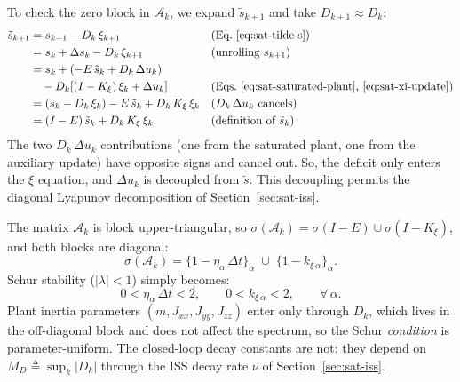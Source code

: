 \documentclass[conf]{new-aiaa}
\begin{document}
To check the zero block in $\mathcal{A}_k$, we expand $\tilde s_{k+1}$ and take $D_{k+1} \approx D_k$:
\small
\begingroup
\setlength{\jot}{1pt}
\begin{align}
\tilde s_{k+1}
&= s_{k+1} - D_k\, \xi_{k+1}
& &\text{(Eq.~\ref{eq:sat-tilde-s})} \notag \\
&= s_k + \Delta s_k - D_k\, \xi_{k+1}
& &\text{(unrolling $s_{k+1}$)} \notag \\
&= s_k + (-E\, \tilde s_k + D_k\, \Delta u_k) \notag \\
&\quad - D_k\!\left[ (I - K_\xi)\, \xi_k + \Delta u_k \right]
& &\text{(Eqs.~\ref{eq:sat-saturated-plant}, \ref{eq:sat-xi-update})} \notag \\
&= (s_k - D_k\, \xi_k) - E\, \tilde s_k + D_k\, K_\xi\, \xi_k
& &\text{($D_k\, \Delta u_k$ cancels)} \notag \\
\label{eq:sat-cancellation}
&= (I - E)\, \tilde s_k + D_k\, K_\xi\, \xi_k.
& &\text{(definition of $\tilde s_k$)}
\end{align}
\endgroup
\normalsize
The two $D_k\, \Delta u_k$ contributions (one from the saturated plant, one from the auxiliary update) have opposite signs and cancel out. So, the deficit only enters the $\xi$ equation, and $\Delta u_k$ is decoupled from $\tilde s$. This decoupling permits the diagonal Lyapunov decomposition of Section~\ref{sec:sat-iss}.

The matrix $\mathcal{A}_k$ is block upper-triangular, so $\sigma(\mathcal{A}_k) = \sigma(I - E) \cup \sigma(I - K_\xi)$, and both blocks are diagonal:
\small
\begin{equation}
\label{eq:sat-spectrum}
\sigma(\mathcal{A}_k) = \{1 - \eta_\alpha\,\Delta t\}_\alpha \;\cup\; \{1 - k_{\xi\, \alpha}\}_\alpha.
\end{equation}
\normalsize
Schur stability ($|\lambda| < 1$) simply becomes:
\begin{equation}
\label{eq:sat-schur}
0 < \eta_\alpha\, \Delta t < 2,
\qquad
0 < k_{\xi\, \alpha} < 2,
\qquad \forall\, \alpha.
\end{equation}
Plant inertia parameters $(m, J_{xx}, J_{yy}, J_{zz})$ enter only through $D_k$, which lives in the off-diagonal block and does not affect the spectrum, so the Schur \emph{condition} is parameter-uniform. The closed-loop decay constants are not: they depend on $M_D \triangleq \sup_k |D_k|$ through the ISS decay rate $\nu$ of Section~\ref{sec:sat-iss}.
\end{document}
